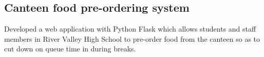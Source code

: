 \documentclass[a4paper,hidelinks]{resume} %
\begin{document}
\begin{minipage}[t]{0.50\textwidth}
    \subsection{Canteen food pre-ordering system}

    Developed a web application with Python Flask which allows students and staff members in River Valley High School to pre-order food from the canteen so as to cut down on queue time in during breaks.
    
    \sectionspace %
    

\end{minipage} %
\end{document}
